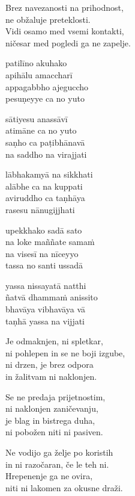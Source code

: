 Brez navezanosti na prihodnost,\\
ne obžaluje preteklosti.\\
Vidi osamo med vsemi kontakti,\\
ničesar med pogledi ga ne zapelje.


\clearpage

patilīno akuhako\\
apihālu amaccharī\\
appagabbho ajeguccho\\
pesuṇeyye ca no yuto

sātiyesu anassāvī\\
atimāne ca no yuto\\
saṇho ca paṭibhānavā\\
na saddho na virajjati

lābhakamyā na sikkhati\\
alābhe ca na kuppati\\
aviruddho ca taṇhāya\\
rasesu nānugijjhati

upekkhako sadā sato\\
na loke maññate samaṁ\\
na visesī na nīceyyo\\
tassa no santi ussadā

yassa nissayatā natthi\\
ñatvā dhammaṁ anissito\\
bhavāya vibhavāya vā\\
taṇhā yassa na vijjati


\clearpage

Je odmaknjen, ni spletkar,\\
ni pohlepen in se ne boji izgube,\\
ni drzen, je brez odpora\\
in žalitvam ni naklonjen.

Se ne predaja prijetnostim,\\
ni naklonjen zaničevanju,\\
je blag in bistrega duha,\\
ni pobožen niti ni pasiven.

Ne vodijo ga želje po koristih\\
in ni razočaran, če le teh ni.\\
Hrepenenje ga ne ovira,\\
niti ni lakomen za okusne draži.

